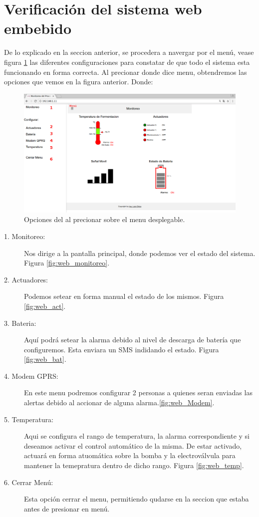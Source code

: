 \section{Verificación del sistema web embebido} 
De lo explicado en la seccion anterior, se procedera a navergar por el menú, vease figura \ref{fig:web_menus_num} las diferentes configuraciones para constatar de que todo el sistema esta funcionando en forma correcta. Al precionar donde dice menu, obtendremos las opciones que vemos en la figura anterior. Donde:

\begin{figure}[h]
  \centering
  \includegraphics[scale=.25]{./Figures/web_menus_num.png}
  \caption{Opciones del al precionar sobre el menu desplegable.}
  \label{fig:web_menus_num}
\end{figure}



\begin{description}
  \item[1. Monitoreo:] Nos dirige a la pantalla principal, donde podemos ver el estado del sistema. Figura \ref{fig:web_monitoreo}.
  \item[2. Actuadores:] Podemos setear en forma manual el estado de los mismos. Figura \ref{fig:web_act}.
  \item[3. Bateria:] Aquí podrá setear la alarma debido al nivel de descarga de batería que configuremos. Esta enviara un SMS indidando el estado. Figura \ref{fig:web_bat}.
  \item[4. Modem GPRS:] En este menu podremos configurar 2 personas a quienes seran enviadas las alertas debido al accionar de alguna alarma.\ref{fig:web_Modem}.
  \item[5. Temperatura:] Aqui se configura el rango de temperatura, la alarma correspondiente y si deseamos activar el control automático de la misma. De estar activado, actuará en forma atuomática sobre la bomba y la electroválvula para mantener la temepratura dentro de dicho rango. Figura \ref{fig:web_temp}.
  \item[6. Cerrar Menú:] Esta opción cerrar el menu, permitiendo qudarse en la seccion que estaba antes de presionar en menú.
\end{description}

